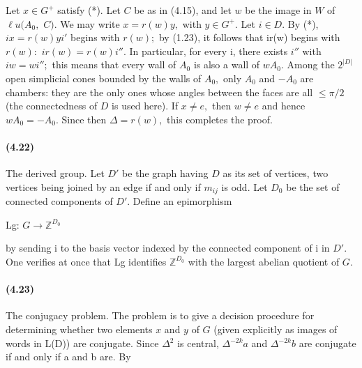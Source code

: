 \documentclass[10pt,a4paper]{article}
\begin{document}
Let \ensuremath{x\in{}G^{+}} satisfy (*). Let \ensuremath{C} be as in (4.15), and let \ensuremath{w} be the image in \ensuremath{W} of \ensuremath{\ell{}u(A_0,} \ensuremath{C).} We may write \ensuremath{x=r(w)y,} with \ensuremath{y\in{}G^{+}.} Let \ensuremath{i\in{}D.} By (*), \ensuremath{ix=r(w)yi'} begins with \ensuremath{r(w);} by (1.23), it follows that ir(w) begins with \ensuremath{r(w):} \ensuremath{ir(w)=r(w)i''.} In particular, for every i, there exists \ensuremath{i''} with \ensuremath{iw=wi'';} this means that every wall of \ensuremath{A_0} is also a wall of \ensuremath{wA_0.} Among the \ensuremath{2^{|D|}} open simplicial cones bounded by the walls of \ensuremath{A_0,} only \ensuremath{A_0} and \ensuremath{-A_0} are chambers: they are the only ones whose angles between the faces are all \ensuremath{\le{}\pi{}/2} (the connectedness of \ensuremath{D} is used here). If \ensuremath{x\ne{}e,} then \ensuremath{w\ne{}e} and hence \ensuremath{wA_0=-A_0.} Since then \ensuremath{\Delta{}=r(w),} this completes the proof.\par

\paragraph{(4.22)} The derived group. Let \ensuremath{D'} be the graph having \ensuremath{D} as its set of vertices, two vertices being joined by an edge if and only if \ensuremath{m_{ij}} is odd. Let \ensuremath{D_0} be the set of connected components of \ensuremath{D'.} Define an epimorphism

Lg: \ensuremath{G\longrightarrow{}\mathbb{Z}^{D_0}}\par

by sending i to the basis vector indexed by the connected component of i in \ensuremath{D'.} One verifies at once that Lg identifies \ensuremath{\mathbb{Z}^{D_0}} with the largest abelian quotient of \ensuremath{G.}\par

\paragraph{(4.23)} The conjugacy problem. The problem is to give a decision procedure for determining whether two elements \ensuremath{x} and \ensuremath{y} of \ensuremath{G} (given explicitly as images of words in L(D)) are conjugate. Since \ensuremath{\Delta{}^{2}} is central, \ensuremath{\Delta{}^{-2k}a} and \ensuremath{\Delta{}^{-2k}b} are conjugate if and only if a and b are. By
\end{document}
